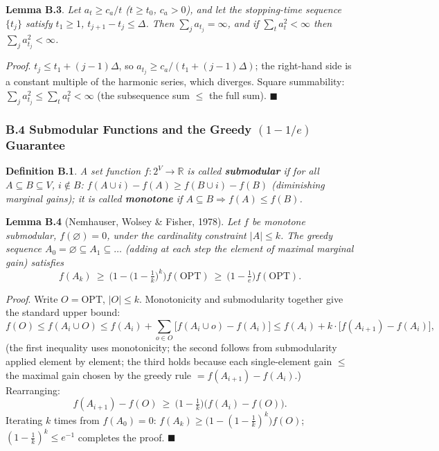 \documentclass[
  11pt]{article}
\begin{document}
\textbf{Lemma B.3}. \emph{Let \(a_t \ge c_a/t\) (\(t \ge t_0\),
\(c_a > 0\)), and let the stopping-time sequence \(\{t_j\}\) satisfy
\(t_1 \ge 1\), \(t_{j+1} - t_j \le \Delta\). Then
\(\sum_j a_{t_j} = \infty\), and if \(\sum_t a_t^2 < \infty\) then
\(\sum_j a_{t_j}^2 < \infty\).}

\emph{Proof}. \(t_j \le t_1 + (j-1)\Delta\), so
\(a_{t_j} \ge c_a/(t_1 + (j-1)\Delta)\); the right-hand side is a
constant multiple of the harmonic series, which diverges. Square
summability: \(\sum_j a_{t_j}^2 \le \sum_t a_t^2 < \infty\) (the
subsequence sum \(\le\) the full sum). \(\blacksquare\)

\subsubsection{\texorpdfstring{B.4 Submodular Functions and the Greedy
\((1-1/e)\)
Guarantee}{B.4 Submodular Functions and the Greedy (1-1/e) Guarantee}}\label{b.4-submodular-functions-and-the-greedy-1-1e-guarantee}

\textbf{Definition B.1}. \emph{A set function \(f: 2^V \to \mathbb{R}\)
is called \textbf{submodular} if for all \(A \subseteq B \subseteq V\),
\(i \notin B\): \(f(A \cup i) - f(A) \ge f(B \cup i) - f(B)\)
(diminishing marginal gains); it is called \textbf{monotone} if
\(A \subseteq B \Rightarrow f(A) \le f(B)\).}

\textbf{Lemma B.4} (Nemhauser, Wolsey \& Fisher, 1978). \emph{Let \(f\)
be monotone submodular, \(f(\varnothing) = 0\), under the cardinality
constraint \(|A| \le k\). The greedy sequence
\(A_0 = \varnothing \subseteq A_1 \subseteq \dots\) (adding at each step
the element of maximal marginal gain) satisfies}
\[f(A_k) \ \ge\ \Big(1 - \big(1 - \tfrac1k\big)^k\Big) f(\mathrm{OPT}) \ \ge\ \big(1 - \tfrac1e\big) f(\mathrm{OPT}).\]

\emph{Proof}. Write \(O = \mathrm{OPT}\), \(|O| \le k\). Monotonicity
and submodularity together give the standard upper bound:
\[f(O) \le f(A_i \cup O) \le f(A_i) + \sum_{o \in O}\big[f(A_i \cup o) - f(A_i)\big] \le f(A_i) + k\cdot\big[f(A_{i+1}) - f(A_i)\big],\]
(the first inequality uses monotonicity; the second follows from
submodularity applied element by element; the third holds because each
single-element gain \(\le\) the maximal gain chosen by the greedy rule
\(= f(A_{i+1}) - f(A_i)\).) Rearranging:
\[f(A_{i+1}) - f(O) \ \ge\ \big(1 - \tfrac1k\big)\big(f(A_i) - f(O)\big).\]
Iterating \(k\) times from \(f(A_0) = 0\):
\(f(A_k) \ge \big(1 - (1-\tfrac1k)^k\big) f(O)\);
\((1-\tfrac1k)^k \le e^{-1}\) completes the proof. \(\blacksquare\)
\end{document}
